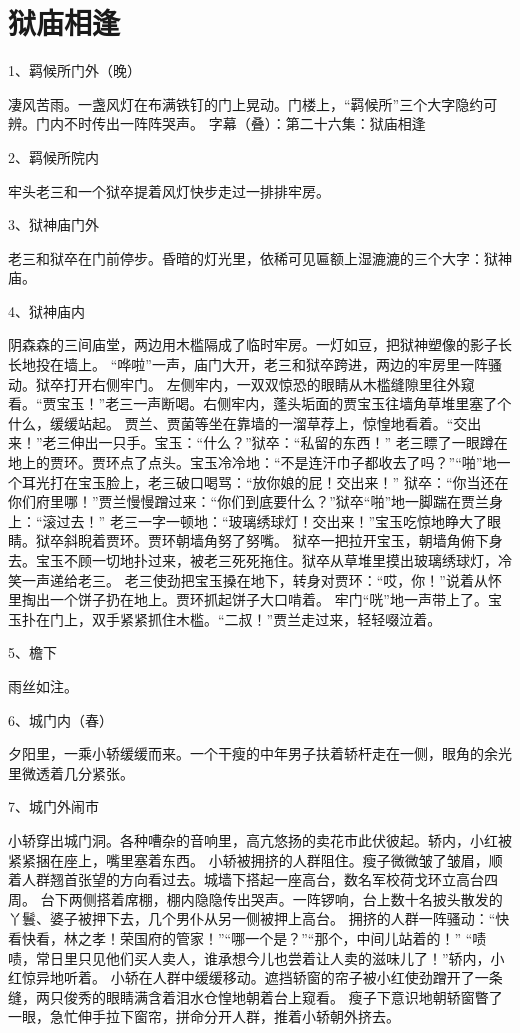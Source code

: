 \section*{狱庙相逢}
1、羁候所门外（晚）\par
凄风苦雨。一盏风灯在布满铁钉的门上晃动。门楼上，“羁候所”三个大字隐约可辨。门内不时传出一阵阵哭声。
字幕（叠）：第二十六集：狱庙相逢

2、羁候所院内\par
牢头老三和一个狱卒提着风灯快步走过一排排牢房。

3、狱神庙门外\par
老三和狱卒在门前停步。昏暗的灯光里，依稀可见匾额上湿漉漉的三个大字：狱神庙。

4、狱神庙内\par
阴森森的三间庙堂，两边用木槛隔成了临时牢房。一灯如豆，把狱神塑像的影子长长地投在墙上。
“哗啦”一声，庙门大开，老三和狱卒跨进，两边的牢房里一阵骚动。狱卒打开右侧牢门。
左侧牢内，一双双惊恐的眼睛从木槛缝隙里往外窥看。“贾宝玉！”老三一声断喝。右侧牢内，蓬头垢面的贾宝玉往墙角草堆里塞了个什么，缓缓站起。
贾兰、贾菌等坐在靠墙的一溜草荐上，惊惶地看着。“交出来！”老三伸出一只手。宝玉：“什么？”狱卒：“私留的东西！”
老三瞟了一眼蹲在地上的贾环。贾环点了点头。宝玉冷冷地：“不是连汗巾子都收去了吗？”“啪”地一个耳光打在宝玉脸上，老三破口喝骂：“放你娘的屁！交出来！”
狱卒：“你当还在你们府里哪！”贾兰慢慢蹭过来：“你们到底要什么？”狱卒“啪”地一脚踹在贾兰身上：“滚过去！”
老三一字一顿地：“玻璃绣球灯！交出来！”宝玉吃惊地睁大了眼睛。狱卒斜睨着贾环。贾环朝墙角努了努嘴。
狱卒一把拉开宝玉，朝墙角俯下身去。宝玉不顾一切地扑过来，被老三死死拖住。狱卒从草堆里摸出玻璃绣球灯，冷笑一声递给老三。
老三使劲把宝玉搡在地下，转身对贾环：“哎，你！”说着从怀里掏出一个饼子扔在地上。贾环抓起饼子大口啃着。
牢门“咣”地一声带上了。宝玉扑在门上，双手紧紧抓住木槛。“二叔！”贾兰走过来，轻轻啜泣着。

5、檐下\par
雨丝如注。

6、城门内（春）\par
夕阳里，一乘小轿缓缓而来。一个干瘦的中年男子扶着轿杆走在一侧，眼角的余光里微透着几分紧张。

7、城门外闹市\par
小轿穿出城门洞。各种嘈杂的音响里，高亢悠扬的卖花市此伏彼起。轿内，小红被紧紧捆在座上，嘴里塞着东西。
小轿被拥挤的人群阻住。瘦子微微皱了皱眉，顺着人群翘首张望的方向看过去。城墙下搭起一座高台，数名军校荷戈环立高台四周。
台下两侧搭着席棚，棚内隐隐传出哭声。一阵锣响，台上数十名披头散发的丫鬟、婆子被押下去，几个男仆从另一侧被押上高台。
拥挤的人群一阵骚动：“快看快看，林之孝！荣国府的管家！”“哪一个是？”“那个，中间儿站着的！”
“啧啧，常日里只见他们买人卖人，谁承想今儿也尝着让人卖的滋味儿了！”轿内，小红惊异地听着。
小轿在人群中缓缓移动。遮挡轿窗的帘子被小红使劲蹭开了一条缝，两只俊秀的眼睛满含着泪水仓惶地朝着台上窥看。
瘦子下意识地朝轿窗瞥了一眼，急忙伸手拉下窗帘，拼命分开人群，推着小轿朝外挤去。

